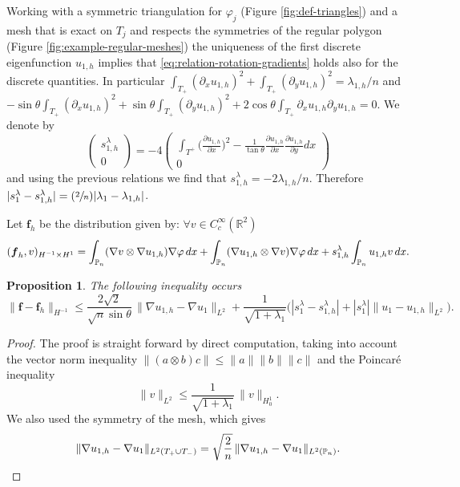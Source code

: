 \documentclass[11pt]{article}
\numberwithin{equation}{section}\newtheorem*{jepEnonce}{\jepEnonceTitle}\newenvironment{enonce*}[1]{\def\jepEnonceTitle{#1}\jepEnonce}{\endjepEnonce}\newtheorem*{conj*}{Conjecture}
\newcommand{\Psfrac}[2]{(\sfrac{#1}{#2})}
\theoremstyle{plain}
\newtheorem{propo}[thm]{Proposition}
\theoremstyle{definition}
\newcommand{\bo}[1]{{\boldsymbol#1}}
\def\R{\mathbb{R}}
\def\Pp{{\mathbb{P}_n}}
\newcommand{\lb}{\lambda}
\let\jepOriginalSfrac\sfrac
\renewcommand{\sfrac}[2]{{\jepOriginalSfrac{#1}{#2}}}
\begin{document}
Working with a symmetric triangulation for $\varphi_j$ (Figure \ref{fig:def-triangles}) and a mesh that is exact on $T_j$ and respects the symmetries of the regular polygon (Figure \ref{fig:example-regular-meshes}) the uniqueness of the first discrete eigenfunction $u_{1,h}$ implies that \eqref{eq:relation-rotation-gradients} holds also for the discrete quantities. In particular $\int_{T_+}(\partial_x u_{1,h})^2+\int_{T_+}(\partial_y u_{1,h})^2 = \lambda_{1,h}/n$ and $-\sin\theta \int_{T_+}(\partial_x u_{1,h})^2+\sin \theta \int_{T_+}(\partial_y u_{1,h})^2+2\cos\theta \int_{T_+}\partial_x u_{1,h}\partial_y u_{1,h} = 0$.
We denote by
\[
\begin{pmatrix}s_{1,h}^\lambda \\ 0\end{pmatrix} = -4 \begin{pmatrix} \displaystyle \int_{T^+ }\Big (\frac{\partial u_{1,h}}{\partial x} \Big)^2 - \frac{1}{\tan \theta} \frac{\partial u_{1,h} }{\partial x} \frac{\partial u_{1,h}}{\partial y}dx\\0 \end{pmatrix}
\]
and using the previous relations we find that $s_{1,h}^\lambda = -2\lambda_{1,h}/n$. Therefore $|s_1^\lambda-s_{1,h}^\lambda|=\Psfrac{2}{n}|\lambda_1-\lambda_{1,h}|$.

Let
$\bo f_h$ be the distribution given by: $\forall v \in C_c^\infty (\R^2)$
\[
(\bo f_h,v)_{H^{-1}\times H^1} = \int_{\Pp}(\nabla v \otimes \nabla u_{1,h})\nabla \varphi \notag \, dx + \int_{\Pp}(\nabla u_{1,h} \otimes \nabla v)\nabla \varphi \notag \, dx+s_{1,h}^\lambda \int_{\Pp} u_{1,h}v\, dx.
\]

\begin{propo}
The following inequality occurs
\[
\|\bo f-\bo f_h\|_{H^{-1}} \le \frac{2 \sqrt{2}}{\sqrt{n} \sin \theta }\,\|\nabla u_{1,h}-\nabla u_1\|_{L^2} + \frac{1}{\sqrt{1+\lb_1}}\Big (|s_1^\lambda- s_{1,h}^\lambda |+|s_1^\lambda| \|u_1-u_{1,h}\|_{L^2}\Big).
\]
\end{propo}

\begin{proof}
The proof is straight forward by direct computation, taking into account the vector norm inequality $\|(a\otimes b)c\|\le \|a\| \|b \| \|c\|$ and the Poincaré inequality
\[
\|v\|_{L^2} \le \frac{1}{\sqrt{1+ \lb_1}}\, \|v\|_{H^1_0}.
\]
We also used the symmetry of the mesh, which gives
\[
\|\nabla u_{1,h}-\nabla u_1\|_{L^2(T_+\cup T_-)}= \sqrt{\frac 2n}\, \|\nabla u_{1,h}-\nabla u_1\|_{L^2(\Pp)}.\qedhere
\]
\end{proof}
\end{document}

